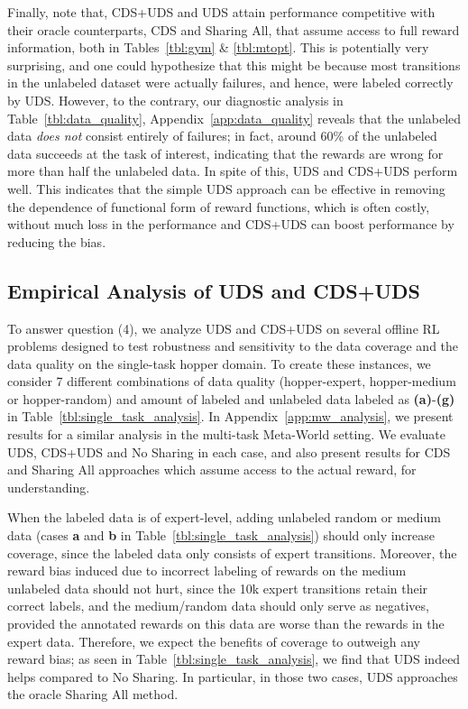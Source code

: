 Finally, note that, CDS+UDS and UDS attain performance competitive with their oracle counterparts, CDS and Sharing All, that assume access to full reward information, both in Tables~\ref{tbl:gym} \& \ref{tbl:mtopt}. This is potentially very surprising, and one could hypothesize that this might be because most transitions in the unlabeled dataset were actually failures, and hence, were labeled correctly by UDS. However, to the contrary, our diagnostic analysis in Table~\ref{tbl:data_quality}, Appendix~\ref{app:data_quality} reveals that the unlabeled data \emph{does not} consist entirely of failures; in fact, around 60\% of the unlabeled data succeeds at the task of interest, indicating that the rewards are wrong for more than half the unlabeled data. In spite of this, UDS and CDS+UDS perform well. This indicates that the simple UDS approach can be effective in removing the dependence of functional form of reward functions, which is often costly, without much loss in the performance and CDS+UDS can boost performance by reducing the bias.


\subsection{Empirical Analysis of UDS and CDS+UDS}
\label{sec:empirical_analysis}

To answer question (4), we analyze UDS and CDS+UDS on several offline RL problems designed to test robustness and sensitivity to the data coverage and the data quality on the single-task hopper domain. To create these instances, we consider 7 different combinations of data quality ({hopper-expert}, {hopper-medium} or {hopper-random}) and amount of labeled and unlabeled data labeled as \textbf{(a)}-\textbf{(g)} in Table~\ref{tbl:single_task_analysis}. In Appendix~\ref{app:mw_analysis}, we present results for a similar analysis in the multi-task Meta-World setting. We evaluate UDS, CDS+UDS and No Sharing in each case, and also present results for CDS and Sharing All approaches which assume access to the actual reward, for understanding. 


When the labeled data is of expert-level, adding unlabeled random or medium data (cases \textbf{a} and \textbf{b} in Table~\ref{tbl:single_task_analysis}) should only increase coverage, since the labeled data only consists of expert transitions. Moreover, the reward bias induced due to incorrect labeling of rewards on the medium unlabeled data should not hurt, since the 10k expert transitions retain their correct labels, and the medium/random data should only serve as negatives, provided the annotated rewards on this data are worse than the rewards in the expert data. Therefore, we expect the benefits of coverage to outweigh any reward bias; as seen in Table~\ref{tbl:single_task_analysis}, we find that UDS indeed helps compared to No Sharing. In particular, in those two cases, UDS approaches the oracle Sharing All method. 

